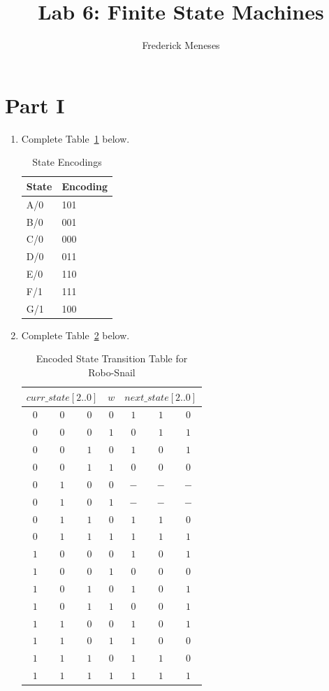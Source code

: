 \documentclass{article}
\title{Lab 6: Finite State Machines}
\author{Frederick Meneses}
\begin{document}
\maketitle

\section{Part I}

\begin{enumerate}

\item Complete Table~\ref{t:part1_state_encodings} below.

\begin{table}[ht!]
\caption{State Encodings}
\label{t:part1_state_encodings}
\centering
\begin{tabular}{|l|l|}
\hline
State & Encoding \\ \hline
A/0 & 101 \\ \hline
B/0 & 001 \\ \hline
C/0 & 000 \\ \hline
D/0 & 011 \\ \hline
E/0 & 110 \\ \hline
F/1 & 111 \\ \hline
G/1 & 100 \\ \hline
\end{tabular}
\end{table}

\item Complete Table~\ref{t:part1_encoded_transition_table} below.

\begin{table}[ht!]
\caption{Encoded State Transition Table for Robo-Snail}
\label{t:part1_encoded_transition_table}
\centering
\begin{tabular}{cccc|ccc}
\multicolumn{3}{c}{$curr\_state[2..0]$}&$w$&\multicolumn{3}{c}{$next\_state[2..0]$}\\
\hline
$0$&$0$&$0$&$0$&$1$&$1$&$0$\\
$0$&$0$&$0$&$1$&$0$&$1$&$1$\\
$0$&$0$&$1$&$0$&$1$&$0$&$1$\\
$0$&$0$&$1$&$1$&$0$&$0$&$0$\\
$0$&$1$&$0$&$0$&$-$&$-$&$-$\\
$0$&$1$&$0$&$1$&$-$&$-$&$-$\\
$0$&$1$&$1$&$0$&$1$&$1$&$0$\\
$0$&$1$&$1$&$1$&$1$&$1$&$1$\\
$1$&$0$&$0$&$0$&$1$&$0$&$1$\\
$1$&$0$&$0$&$1$&$0$&$0$&$0$\\
$1$&$0$&$1$&$0$&$1$&$0$&$1$\\
$1$&$0$&$1$&$1$&$0$&$0$&$1$\\
$1$&$1$&$0$&$0$&$1$&$0$&$1$\\
$1$&$1$&$0$&$1$&$1$&$0$&$0$\\
$1$&$1$&$1$&$0$&$1$&$1$&$0$\\
$1$&$1$&$1$&$1$&$1$&$1$&$1$\\


\end{tabular}
\end{table}
\end{enumerate}
\end{document}
